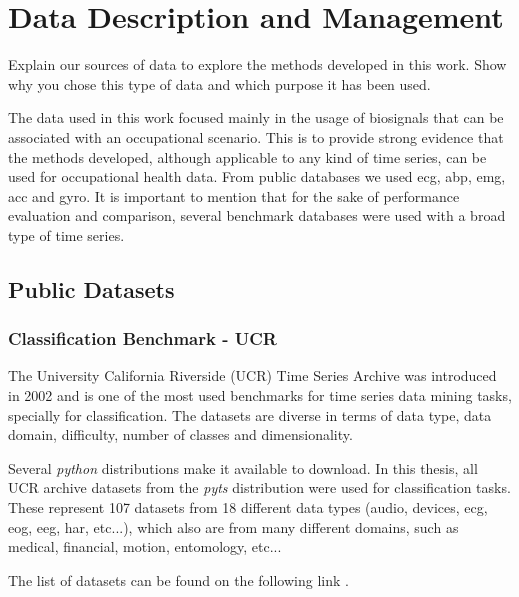 
%

\chapter{Data Description and Management}
\label{cha:data}

Explain our sources of data to explore the methods developed in this work. Show why you chose this type of data and which purpose it has been used. 

The data used in this work focused mainly in the usage of biosignals that can be associated with an occupational scenario. This is to provide strong evidence that the methods developed, although applicable to any kind of time series, can be used for occupational health data. From public databases we used \gls{ecg}, \gls{abp}, \gls{emg}, \gls{acc} and \gls{gyro}. It is important to mention that for the sake of performance evaluation and comparison, several benchmark databases were used with a broad type of time series.

\section{Public Datasets}

\subsection{Classification Benchmark - UCR}

The University California Riverside (UCR) Time Series Archive was introduced in 2002 
and is one of the most used benchmarks for time series data mining tasks, specially for classification.  The datasets are diverse in terms of data type, data domain, difficulty, number of classes and dimensionality\cite{ucr}.
\par
Several \textit{python} distributions make it available to download. In this thesis, all UCR archive datasets from the \textit{pyts} distribution were used for classification tasks. These represent 107 datasets from 18 different data types (audio, devices, \gls{ecg}, \gls{eog}, \gls{eeg}, \gls{har}, etc...), which also are from many different domains, such as medical, financial, motion, entomology, etc...\cite{ucr}
\par
The list of datasets can be found on the following link \cite{ucr_site}.
 

